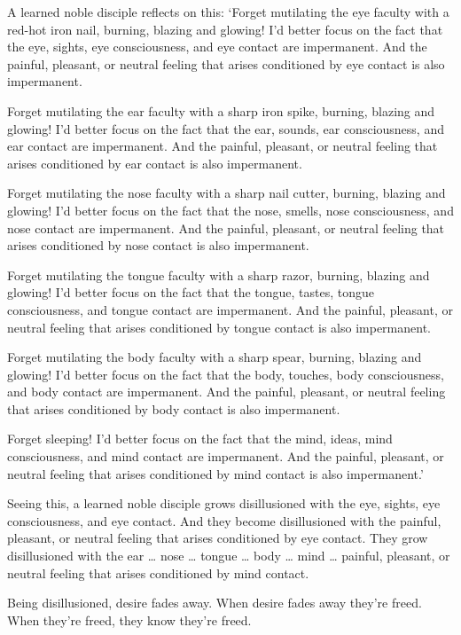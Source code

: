 \documentclass[12pt,openany]{book}%
\begin{document}
A learned noble disciple reflects on this: ‘Forget mutilating the eye faculty with a red-hot iron nail, burning, blazing and glowing! I’d better focus on the fact that the eye, sights, eye consciousness, and eye contact are impermanent. And the painful, pleasant, or neutral feeling that arises conditioned by eye contact is also impermanent. 

Forget mutilating the ear faculty with a sharp iron spike, burning, blazing and glowing! I’d better focus on the fact that the ear, sounds, ear consciousness, and ear contact are impermanent. And the painful, pleasant, or neutral feeling that arises conditioned by ear contact is also impermanent. 

Forget mutilating the nose faculty with a sharp nail cutter, burning, blazing and glowing! I’d better focus on the fact that the nose, smells, nose consciousness, and nose contact are impermanent. And the painful, pleasant, or neutral feeling that arises conditioned by nose contact is also impermanent. 

Forget mutilating the tongue faculty with a sharp razor, burning, blazing and glowing! I’d better focus on the fact that the tongue, tastes, tongue consciousness, and tongue contact are impermanent. And the painful, pleasant, or neutral feeling that arises conditioned by tongue contact is also impermanent. 

Forget mutilating the body faculty with a sharp spear, burning, blazing and glowing! I’d better focus on the fact that the body, touches, body consciousness, and body contact are impermanent. And the painful, pleasant, or neutral feeling that arises conditioned by body contact is also impermanent. 

Forget sleeping! I’d better focus on the fact that the mind, ideas, mind consciousness, and mind contact are impermanent. And the painful, pleasant, or neutral feeling that arises conditioned by mind contact is also impermanent.’ 

Seeing this, a learned noble disciple grows disillusioned with the eye, sights, eye consciousness, and eye contact. And they become disillusioned with the painful, pleasant, or neutral feeling that arises conditioned by eye contact. They grow disillusioned with the ear … nose … tongue … body … mind … painful, pleasant, or neutral feeling that arises conditioned by mind contact. 

Being disillusioned, desire fades away. When desire fades away they’re freed. When they’re freed, they know they’re freed. 
\end{document}
